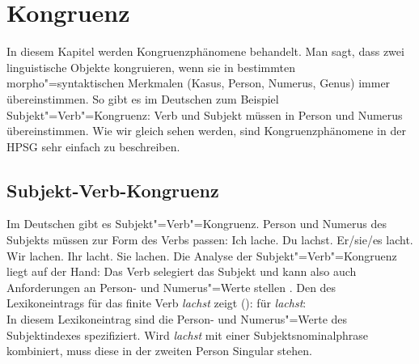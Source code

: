 

\chapter{Kongruenz}
\label{Kapitel-kongruenz}

In diesem Kapitel werden Kongruenzphänomene behandelt. Man sagt, dass zwei linguistische
Objekte kongruieren, wenn sie in bestimmten morpho"=syntaktischen Merkmalen (\zb Kasus,
Person, Numerus, Genus) immer übereinstimmen.
So gibt es im Deutschen zum Beispiel Subjekt"=Verb"=Kongruenz: 
Verb und Subjekt müssen in Person und Numerus übereinstimmen.
Wie wir gleich sehen werden, sind Kongruenzphänomene in der HPSG sehr einfach
zu beschreiben.
\largerpage\enlargethispage{2pt}

\section{Subjekt-Verb-Kongruenz}

Im Deutschen gibt es Subjekt"=Verb"=Kongruenz. Person und Numerus des Subjekts
müssen zur Form des Verbs passen:
\eal
\ex Ich lache.
\ex Du lachst.
\ex Er/sie/es lacht.
\ex Wir lachen.
\ex Ihr lacht.
\ex Sie lachen.
\zl
Die Analyse der Subjekt"=Verb"=Kongruenz liegt auf der Hand: Das Verb selegiert
das Subjekt und kann also auch Anforderungen an Person- und Numerus"=Werte stellen \citep[]{ps2}.
Den \localw des Lexikoneintrags für das finite Verb \emph{lachst} zeigt ():
\ea
\catw für \emph{lachst}:\\
\z
In diesem Lexikoneintrag sind die Person- und Numerus"=Werte des Subjektindexes spezifiziert. Wird
\emph{lachst} mit einer Subjektsnominalphrase kombiniert, muss diese in der zweiten Person Singular
stehen.

